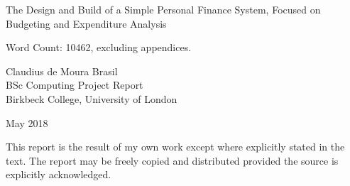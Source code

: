 \begin{titlepage}
  \center
  
  \vspace*{3cm}

  {
    \begin{spacing}{1.2}
      \LARGE The Design and Build of a Simple Personal Finance System, Focused
      on Budgeting and Expenditure Analysis
    \end{spacing}
  }

  \vfill
  
  Word Count: 10462, excluding appendices.
  
  \vfill

  Claudius de Moura Brasil\\
  BSc Computing Project Report\\
  Birkbeck College, University of London

  May 2018

  This report is the result of my own work except where explicitly stated in
  the text. The report may be freely copied and distributed provided the source
  is explicitly acknowledged.
  
  \vfill

\end{titlepage}
